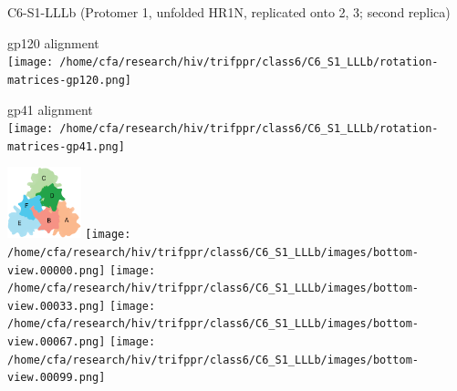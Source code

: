 \begin{frame}[fragile]{C6-S1-LLLb {\tiny (Protomer 1, unfolded HR1N, replicated onto 2, 3; second replica)}}
    \begin{center}
        \begin{minipage}{0.47\textwidth}
            \begin{center}
                gp120 alignment\\
                \texttt{[image: /home/cfa/research/hiv/trifppr/class6/C6\_S1\_LLLb/rotation-matrices-gp120.png]}
            \end{center}
        \end{minipage}
        \begin{minipage}{0.47\textwidth}
            \begin{center}
                gp41 alignment\\
                \texttt{[image: /home/cfa/research/hiv/trifppr/class6/C6\_S1\_LLLb/rotation-matrices-gp41.png]}
            \end{center}
        \end{minipage}

        \includegraphics[width=0.16\textwidth]{trimer_paint_bottom_sodroski_smol.png}
        \texttt{[image: /home/cfa/research/hiv/trifppr/class6/C6\_S1\_LLLb/images/bottom-view.00000.png]}
        \texttt{[image: /home/cfa/research/hiv/trifppr/class6/C6\_S1\_LLLb/images/bottom-view.00033.png]}
        \texttt{[image: /home/cfa/research/hiv/trifppr/class6/C6\_S1\_LLLb/images/bottom-view.00067.png]}
        \texttt{[image: /home/cfa/research/hiv/trifppr/class6/C6\_S1\_LLLb/images/bottom-view.00099.png]}

    \end{center}
\end{frame}


